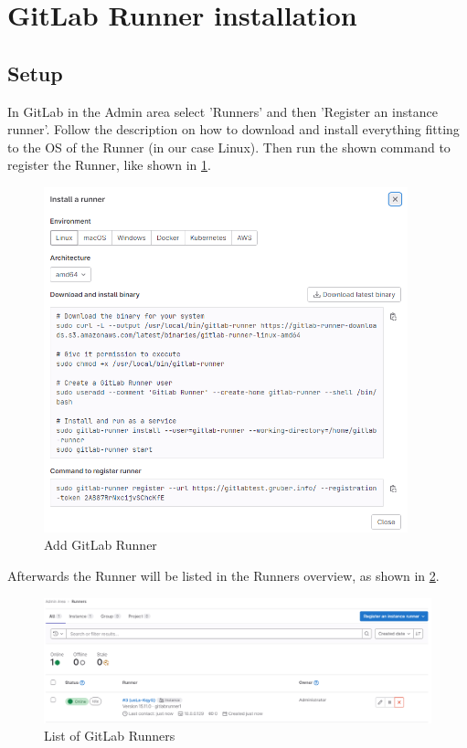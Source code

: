 \section{GitLab Runner installation}

\subsection{Setup}

In GitLab in the Admin area select 'Runners' and then 'Register an instance runner'.
Follow the description on how to download and install everything fitting to the OS of the Runner (in our case Linux).
Then run the shown command to register the Runner, like shown in \ref{fig:gitlab_add_runner}.

\begin{figure}[H]
	\centering
	\includegraphics[height=10cm]{images/gitlab_add_runner.png}
	\caption{Add GitLab Runner}
	\label{fig:gitlab_add_runner}
\end{figure}

Afterwards the Runner will be listed in the Runners overview, as shown in \ref{fig:gitlab_list_runners}.

\begin{figure}[H]
	\centering
	\includegraphics[width=14cm]{images/gitlab_list_runners.png}
	\caption{List of GitLab Runners}
	\label{fig:gitlab_list_runners}
\end{figure}

